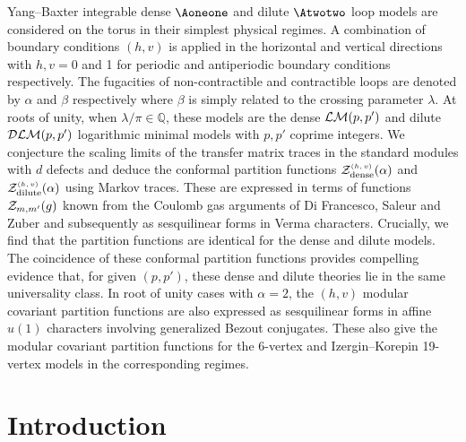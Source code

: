 \documentclass[11pt]{article}
\numberwithin{equation}{section}
\theoremstyle{definition}
\numberwithin{equation}{section}
\begin{document}
Yang--Baxter integrable dense $\Aoneone$ and dilute $\Atwotwo$ loop models are considered on the torus in their simplest physical regimes. A combination of boundary conditions $(h,v)$ is applied in the horizontal and vertical directions with $h,v=0$ and 1 for periodic and antiperiodic boundary conditions respectively. The fugacities of non-contractible and contractible loops are denoted by $\alpha$ and $\beta$ respectively where $\beta$ is simply related to the crossing parameter $\lambda$. At roots of unity, when $\lambda/\pi\in\mathbb Q$, these models are the dense ${\cal LM}(p,p')$ and dilute ${\cal DLM}(p,p')$ logarithmic minimal models with $p,p'$ coprime integers. We conjecture the scaling limits of the transfer matrix traces in the standard modules with $d$ defects and deduce the conformal partition functions ${\cal Z}_{\textrm{dense}}^{\textrm{\tiny$(h,v)$}}(\alpha)$ and ${\cal Z}_{\textrm{dilute}}^{\textrm{\tiny$(h,v)$}}(\alpha)$ using Markov traces.  These are expressed in terms of functions ${\cal Z}_{m,m'}(g)$ known from the Coulomb gas arguments of Di Francesco, Saleur and Zuber and subsequently as sesquilinear forms in Verma characters. Crucially, we find that the partition functions are identical for the dense and dilute models. 
The coincidence of these conformal partition functions provides compelling evidence that, for given $(p,p')$, these dense and dilute theories lie in the same universality class. In root of unity cases with $\alpha=2$, the $(h,v)$ modular covariant partition functions are also expressed as sesquilinear forms in affine $u(1)$ characters involving generalized Bezout conjugates. These also give the modular covariant partition functions for the 6-vertex and Izergin--Korepin 19-vertex models in the corresponding regimes. 


\newpage
\tableofcontents

{}

\setcounter{footnote}{0}

%
\section{Introduction}
%
\end{document}

